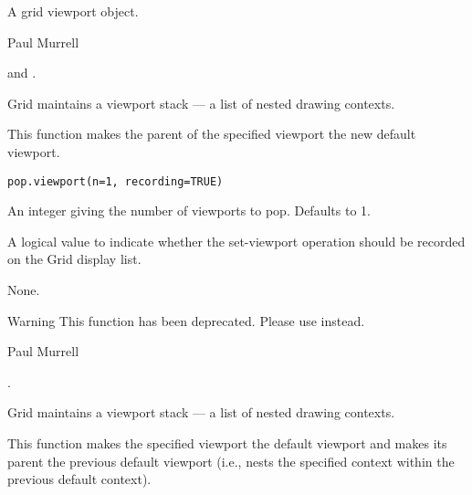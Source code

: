 %
\begin{Value}
A grid viewport object.
\end{Value}
%
\begin{Author}\relax
 Paul Murrell 
\end{Author}
%
\begin{SeeAlso}\relax
{} and
.
\end{SeeAlso}
%
\begin{Description}\relax
Grid maintains a viewport stack --- a list of nested drawing
contexts.

This function makes the parent of the specified viewport the
new default viewport.
\end{Description}
%
\begin{Usage}
\begin{verbatim}
pop.viewport(n=1, recording=TRUE)
\end{verbatim}
\end{Usage}
%
\begin{Arguments}
\begin{ldescription}
\item[\code{n}] An integer giving the number of viewports to pop.
Defaults to 1.
\item[\code{recording}] A logical value to indicate whether the set-viewport
operation should be recorded on the Grid display list.
\end{ldescription}
\end{Arguments}
%
\begin{Value}
None.
\end{Value}
%
\begin{Section}{Warning}
This function has been deprecated.  Please use 
instead.
\end{Section}
%
\begin{Author}\relax
Paul Murrell
\end{Author}
%
\begin{SeeAlso}\relax
{}.
\end{SeeAlso}
%
\begin{Description}\relax
Grid maintains a viewport stack --- a list of nested drawing
contexts.

This function makes the specified viewport the default viewport
and makes its parent the previous default viewport (i.e.,
nests the specified context within the previous default context).
\end{Description}
